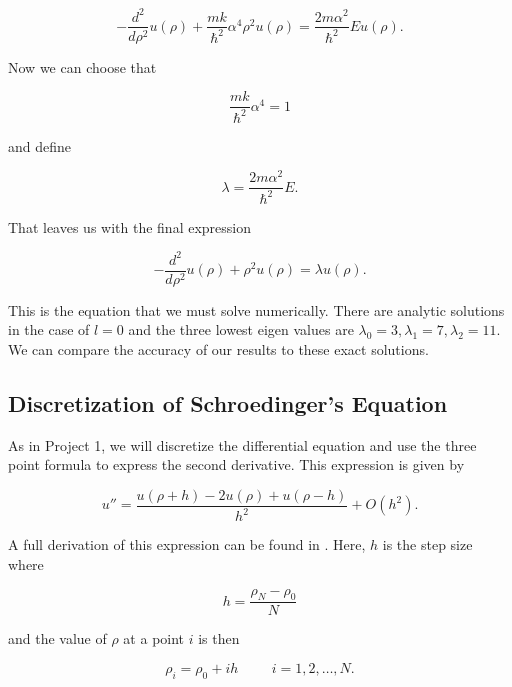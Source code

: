 \documentclass[%
oneside,                 %
final,                   %
10pt]{article}
\begin{document}
\begin{equation*}
  -\frac{d^2}{d\rho^2} u(\rho) 
       + \frac{mk}{\hbar^2} \alpha^4\rho^2u(\rho)  = \frac{2m\alpha^2}{\hbar^2}E u(\rho) .
\end{equation*}

Now we can choose that

\begin{equation*}
\frac{mk}{\hbar^2} \alpha^4 = 1
\end{equation*}

and define

\begin{equation*}
\lambda = \frac{2m\alpha^2}{\hbar^2}E.
\end{equation*}

That leaves us with the final expression

\begin{equation*}
  -\frac{d^2}{d\rho^2} u(\rho) + \rho^2u(\rho)  = \lambda u(\rho) .
\end{equation*}

This is the equation that we must solve numerically.  There are analytic solutions in the case of $l=0$ and the three lowest eigen values are $\lambda_0=3,\lambda_1=7,\lambda_2=11$. We can compare the accuracy of our results to these exact solutions.

\subsection{Discretization of Schroedinger's Equation}

As in Project 1, we will discretize the differential equation and use the three point formula to express the second derivative.  This expression is given by
 
\begin{equation*}
    u''=\frac{u(\rho+h) -2u(\rho) +u(\rho-h)}{h^2} +O(h^2).
    \label{eq:diffoperation}
\end{equation*}

A full derivation of this expression can be found in \cite{LectureNotes}.  Here, $h$ is the step size where 

\begin{equation*}
  h=\frac{\rho_N-\rho_0 }{N}
\end{equation*}

and the value of $\rho$ at a point $i$ is then 

\[
    \rho_i= \rho_0 + ih \hspace{1cm} i=1,2,\dots , N.
\]
\end{document}
